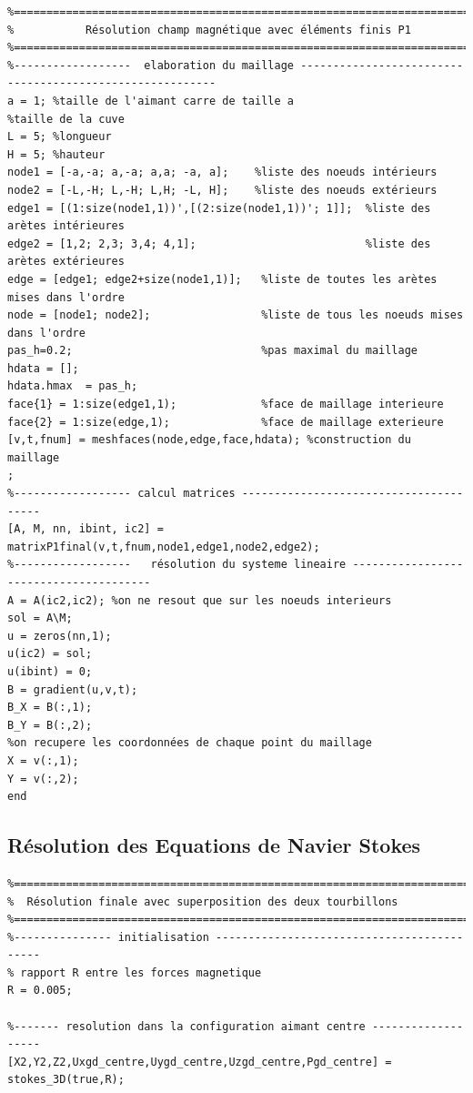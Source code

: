 \documentclass[a4paper,12pt,titlepage]{report}
\begin{document}
\begin{onehalfspace}
\begin{appendix}
\begin{verbatim}
%===========================================================================
%			Résolution champ magnétique avec éléments finis P1
%===========================================================================
%------------------  elaboration du maillage ---------------------------------------------------------
a = 1; %taille de l'aimant carre de taille a
%taille de la cuve
L = 5; %longueur
H = 5; %hauteur
node1 = [-a,-a; a,-a; a,a; -a, a];    %liste des noeuds intérieurs
node2 = [-L,-H; L,-H; L,H; -L, H];    %liste des noeuds extérieurs
edge1 = [(1:size(node1,1))',[(2:size(node1,1))'; 1]];  %liste des arètes intérieures
edge2 = [1,2; 2,3; 3,4; 4,1];                          %liste des arètes extérieures
edge = [edge1; edge2+size(node1,1)];   %liste de toutes les arètes mises dans l'ordre
node = [node1; node2];                 %liste de tous les noeuds mises dans l'ordre
pas_h=0.2;                             %pas maximal du maillage
hdata = [];
hdata.hmax  = pas_h;
face{1} = 1:size(edge1,1);             %face de maillage interieure
face{2} = 1:size(edge,1);              %face de maillage exterieure
[v,t,fnum] = meshfaces(node,edge,face,hdata); %construction du maillage
;
%------------------ calcul matrices ---------------------------------------
[A, M, nn, ibint, ic2] = matrixP1final(v,t,fnum,node1,edge1,node2,edge2);
%------------------   résolution du systeme lineaire ---------------------------------------
A = A(ic2,ic2); %on ne resout que sur les noeuds interieurs
sol = A\M;
u = zeros(nn,1);
u(ic2) = sol;
u(ibint) = 0;  
B = gradient(u,v,t);
B_X = B(:,1);
B_Y = B(:,2);
%on recupere les coordonnées de chaque point du maillage
X = v(:,1);
Y = v(:,2);
end
\end{verbatim}


\subsection{Résolution des Equations de Navier Stokes}
\begin{verbatim}
%=========================================================================% 
%  Résolution finale avec superposition des deux tourbillons
%=========================================================================%
%--------------- initialisation -------------------------------------------
% rapport R entre les forces magnetique
R = 0.005;

%------- resolution dans la configuration aimant centre -------------------
[X2,Y2,Z2,Uxgd_centre,Uygd_centre,Uzgd_centre,Pgd_centre] = stokes_3D(true,R);



\end{verbatim}
\end{appendix}
\end{onehalfspace}
\end{document}
